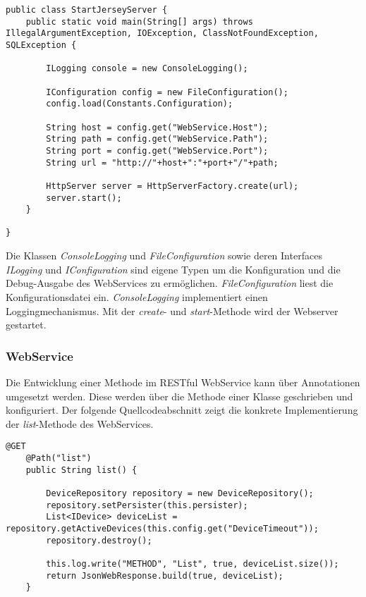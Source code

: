 \begin{lstlisting}[caption={Starten des Jersey Webservers.}]
public class StartJerseyServer {
	public static void main(String[] args) throws IllegalArgumentException, IOException, ClassNotFoundException, SQLException {
		
		ILogging console = new ConsoleLogging();
		
		IConfiguration config = new FileConfiguration();
		config.load(Constants.Configuration);

		String host = config.get("WebService.Host");
		String path = config.get("WebService.Path");
		String port = config.get("WebService.Port");
		String url = "http://"+host+":"+port+"/"+path;
		
		HttpServer server = HttpServerFactory.create(url);
		server.start();
	}

}
\end{lstlisting} 

Die Klassen \textit{ConsoleLogging} und \textit{FileConfiguration} sowie deren Interfaces \textit{ILogging} und \textit{IConfiguration} sind eigene Typen um die Konfiguration und die Debug-Ausgabe des WebServices zu ermöglichen. \textit{FileConfiguration} liest die Konfigurationsdatei ein. \textit{ConsoleLogging} implementiert einen Loggingmechanismus. Mit der \textit{create}- und \textit{start}-Methode wird der Webserver gestartet.


\subsubsection{WebService}
Die Entwicklung einer Methode im RESTful WebService kann über Annotationen umgesetzt werden. Diese werden über die Methode einer Klasse geschrieben und konfiguriert. Der folgende Quellcodeabschnitt zeigt die konkrete Implementierung der \textit{list}-Methode des WebServices.

\begin{lstlisting}[caption={Implementierung der list-Methode.}]
	@GET
	@Path("list")
	public String list() {

		DeviceRepository repository = new DeviceRepository();
		repository.setPersister(this.persister);
		List<IDevice> deviceList = repository.getActiveDevices(this.config.get("DeviceTimeout"));
		repository.destroy();		
		
		this.log.write("METHOD", "List", true, deviceList.size());
		return JsonWebResponse.build(true, deviceList);
	}	
\end{lstlisting} 

